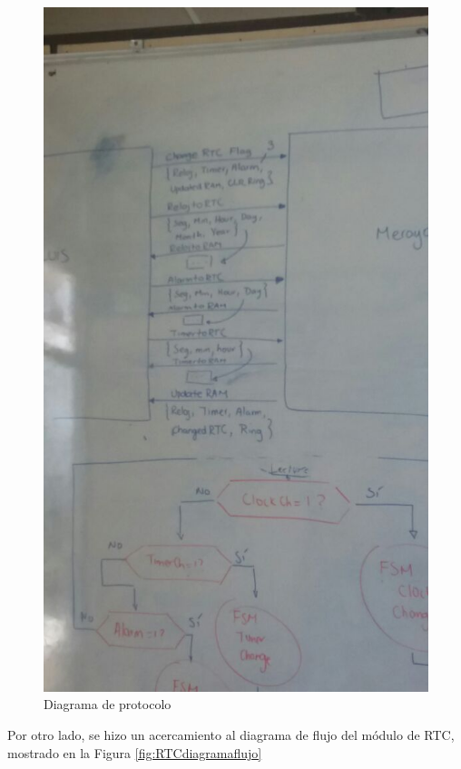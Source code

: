 \documentclass[12pt,a4paper]{report}
\begin{document}
\begin{figure}[hbtp]
	\centering
	\includegraphics[width=14cm]{Img/protocolRTC.jpeg}
	\caption{Diagrama de protocolo}
	\label{fig:protocolRTC}
\end{figure}

Por otro lado, se hizo un acercamiento al diagrama de flujo del módulo de RTC, mostrado en la Figura \ref{fig:RTCdiagramaflujo} \\
\end{document}
